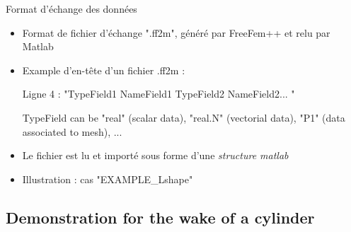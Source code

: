 \documentclass{beamer}
\begin{document}
\begin{frame}{Format d'échange des données}

\begin{itemize}[<+->]


\item Format de fichier d'échange ".ff2m", généré par FreeFem++ et relu par Matlab
 
\item Example d'en-tête d'un fichier .ff2m :


 
Ligne 4 : "TypeField1 NameField1 TypeField2 NameField2... "
  
TypeField can be "real" (scalar data), "real.N" (vectorial data), "P1" (data associated to mesh), ... 

\item Le fichier est lu et importé sous forme d'une {\em structure matlab}   

\item Illustration : cas "EXAMPLE\_Lshape"

\end{itemize}


\end{frame}




\subsection{Demonstration for the wake of a cylinder}
\end{document}
